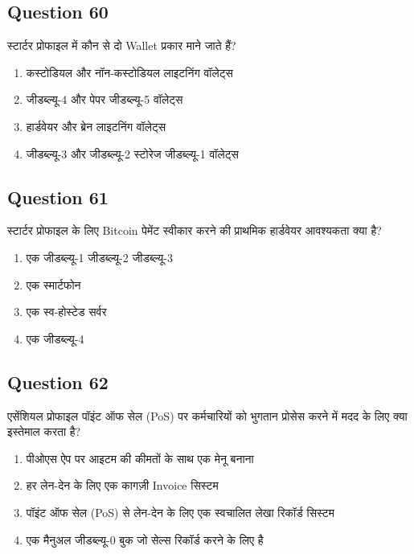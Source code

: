 \documentclass[12pt,a4paper]{article}
\begin{document}
\bigskip


\subsection*{Question 60}
स्टार्टर प्रोफाइल में कौन से दो Wallet प्रकार माने जाते हैं?

\begin{enumerate}[label=\Alph*., leftmargin=*]
\item कस्टोडियल और नॉन-कस्टोडियल लाइटनिंग वॉलेट्स
\item जीडब्ल्यू-4 और पेपर जीडब्ल्यू-5 वॉलेट्स
\item हार्डवेयर और ब्रेन लाइटनिंग वॉलेट्स
\item जीडब्ल्यू-3 और जीडब्ल्यू-2 स्टोरेज जीडब्ल्यू-1 वॉलेट्स
\end{enumerate}

\bigskip


\subsection*{Question 61}
स्टार्टर प्रोफाइल के लिए Bitcoin पेमेंट स्वीकार करने की प्राथमिक हार्डवेयर आवश्यकता क्या है?

\begin{enumerate}[label=\Alph*., leftmargin=*]
\item एक जीडब्ल्यू-1 जीडब्ल्यू-2 जीडब्ल्यू-3
\item एक स्मार्टफोन
\item एक स्व-होस्टेड सर्वर
\item एक जीडब्ल्यू-4
\end{enumerate}

\bigskip


\subsection*{Question 62}
एसेंशियल प्रोफाइल पॉइंट ऑफ सेल (PoS) पर कर्मचारियों को भुगतान प्रोसेस करने में मदद के लिए क्या इस्तेमाल करता है?

\begin{enumerate}[label=\Alph*., leftmargin=*]
\item पीओएस ऐप पर आइटम की कीमतों के साथ एक मेनू बनाना
\item हर लेन-देन के लिए एक कागज़ी Invoice सिस्टम
\item पॉइंट ऑफ सेल (PoS) से लेन-देन के लिए एक स्वचालित लेखा रिकॉर्ड सिस्टम
\item एक मैनुअल जीडब्ल्यू-0 बुक जो सेल्स रिकॉर्ड करने के लिए है
\end{enumerate}
\end{document}
